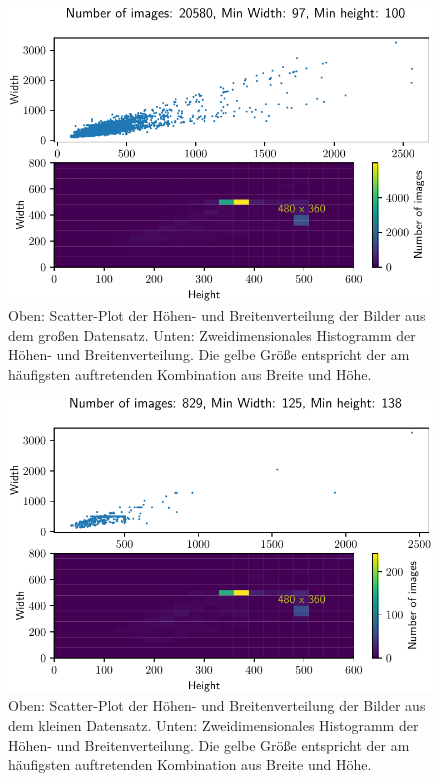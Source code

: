 \begin{figure}
  \centering
  \includegraphics[scale=0.9]{pics/width_height_scatter_hist2d.pdf}
  \caption{Oben: Scatter-Plot der Höhen- und Breitenverteilung der Bilder aus dem großen Datensatz.
  Unten: Zweidimensionales Histogramm der Höhen- und Breitenverteilung.
  Die gelbe Größe entspricht der am häufigsten auftretenden Kombination
  aus Breite und Höhe.}
  \label{fig:scatter_groß}
\end{figure}

\begin{figure}
  \centering
  \includegraphics[scale=0.9]{pics/width_height_scatter_hist2d_klein.pdf}
  \caption{Oben: Scatter-Plot der Höhen- und Breitenverteilung der Bilder aus
  dem kleinen Datensatz.
  Unten: Zweidimensionales Histogramm der Höhen- und Breitenverteilung.
  Die gelbe Größe entspricht der am häufigsten auftretenden Kombination
  aus Breite und Höhe.}
  \label{fig:scatter_klein}
\end{figure}

